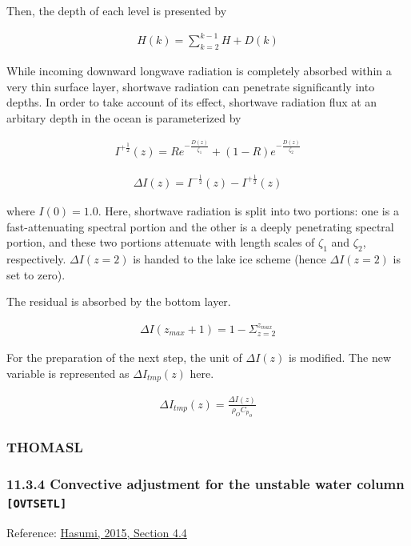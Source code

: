 Then, the depth of each level is presented by

\begin{eqnarray}
    H(k) = \sum _{k=2} ^{k-1} H +D(k)
\end{eqnarray}

While incoming downward longwave radiation is completely absorbed within
a very thin surface layer, shortwave radiation can penetrate
significantly into depths. In order to take account of its effect,
shortwave radiation flux at an arbitary depth in the ocean is
parameterized by

\begin{eqnarray}
     I^{+\frac{1}{2}}(z)  = R e^{-\frac{D(z)}{\zeta_1}} + (1- R)e^{-\frac{D(z)}{\zeta_2}}
\end{eqnarray}

\begin{eqnarray}
    \Delta I(z) = I^{-\frac{1}{2}}(z) - I^{+\frac{1}{2}}(z)
\end{eqnarray}

where \(I(0)=1.0\). Here, shortwave radiation is split into two
portions: one is a fast-attenuating spectral portion and the other is a
deeply penetrating spectral portion, and these two portions attenuate
with length scales of \(\zeta_1\) and \(\zeta_2\), respectively.
\(\Delta I(z=2)\) is handed to the lake ice scheme (hence
\(\Delta I(z=2)\) is set to zero).

The residual is absorbed by the bottom layer.

\begin{eqnarray}
    \Delta I(z_{max}+1) = 1- \Sigma _{z=2}^{z_{max}}
\end{eqnarray}

For the preparation of the next step, the unit of \(\Delta I(z)\) is
modified. The new variable is represented as \(\Delta I_{tmp}(z)\) here.

\begin{eqnarray}
    \Delta I_{tmp}(z) = \frac{\Delta I(z)}{\rho_O {C_p}_o}
\end{eqnarray}

\hypertarget{thomasl}{%
\subsubsection{THOMASL}\label{thomasl}}

\hypertarget{convective-adjustment-for-the-unstable-water-column-ovtsetl}{%
\subsubsection{\texorpdfstring{11.3.4 Convective adjustment for the
unstable water column
\texttt{{[}OVTSETL{]}}}{11.3.4 Convective adjustment for the unstable water column {[}OVTSETL{]}}}\label{convective-adjustment-for-the-unstable-water-column-ovtsetl}}

Reference:
\href{https://ccsr.aori.u-tokyo.ac.jp/~hasumi/COCO/coco4.pdf}{Hasumi,
2015, Section 4.4}
